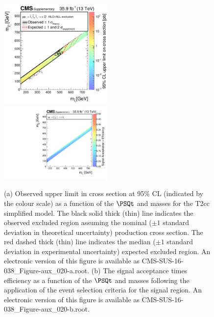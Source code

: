 \begin{figure}
    \begin{center}
            \includegraphics[width=0.50\textwidth]{Supplementary/CMS-SUS-16-038_Figure-aux_020-a}
            \includegraphics[width=0.50\textwidth]{Supplementary/CMS-SUS-16-038_Figure-aux_020-b}
        \caption{ (a) Observed upper limit in cross section at 95\% CL (indicated
        by the colour scale) as a function of 
        the $\PSQt$ and \PSGczDo %
        masses for the 
        T2cc %
        simplified  model.  The  black  solid thick  (thin)  line indicates  the
        observed  excluded  region  assuming   the  nominal  (${\pm}1$  standard
        deviation in theoretical uncertainty)  production cross section. The red
        dashed  thick  (thin)  line  indicates  the  median  (${\pm}1$  standard
        deviation in experimental uncertainty) expected excluded region.
    An electronic version of this figure is available as CMS-SUS-16-038\_Figure-aux\_020-a.root.
        (b) The signal acceptance times efficiency as a function of 
        the $\PSQt$ and \PSGczDo %
        masses following the application of the event selection criteria for the signal region.
    An electronic version of this figure is available as CMS-SUS-16-038\_Figure-aux\_020-b.root.
        }
        \label{fig:T2cc}
    \end{center}
\end{figure}

